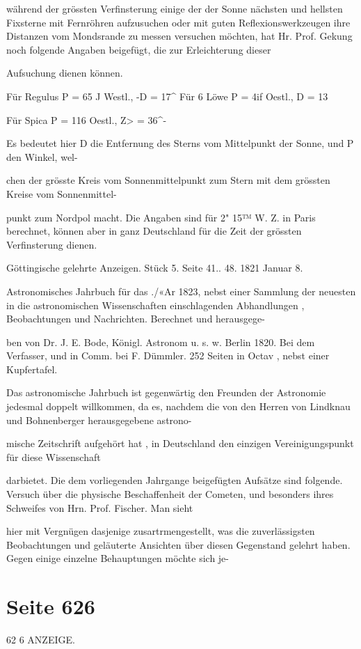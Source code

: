 \documentclass[10pt,a4paper]{article}
\begin{document}
während der grössten Verfinsterung einige der der Sonne nächsten und hellsten Fixsterne mit Fernröhren aufzusuchen oder mit guten Reflexionswerkzeugen ihre Distanzen vom Mondsrande zu messen versuchen möchten, hat Hr. Prof. Gekung noch folgende Angaben beigefügt, die zur Erleichterung dieser

Aufsuchung dienen können.

Für Regulus P = 65 J\textdegree{} Westl., -D = 17\textasciicircum{}\textdegree{} Für 6 Löwe P = 4if\textdegree{} Oestl., D = 13\textdegree{}

Für Spica P = 116\textdegree{} Oestl., Z> = 36\textasciicircum{}-\textdegree{}

Es bedeutet hier D die Entfernung des Sterns vom Mittelpunkt der Sonne, und P den Winkel, wel-

chen der grösste Kreis vom Sonnenmittelpunkt zum Stern mit dem grössten Kreise vom Sonnenmittel-

punkt zum Nordpol macht. Die Angaben sind für 2" 15™ W. Z. in Paris berechnet, können aber in ganz Deutschland für die Zeit der grössten Verfinsterung dienen.

Göttingische gelehrte Anzeigen. Stück 5. Seite 41.. 48. 1821 Januar 8.

Astronomisches Jahrbuch für das ./«Ar 1823, nebst einer Sammlung der neuesten in die astronomischen Wissenschaften einschlagenden Abhandlungen , Beobachtungen und Nachrichten. Berechnet und herausgege-

ben von Dr. J. E. Bode, Königl. Astronom u. s. w. Berlin 1820. Bei dem Verfasser, und in Comm. bei F. Dümmler. 252 Seiten in Octav , nebst einer Kupfertafel.

Das astronomische Jahrbuch ist gegenwärtig den Freunden der Astronomie jedesmal doppelt willkommen, da es, nachdem die von den Herren von Lindknau und Bohnenberger herausgegebene astrono-

mische Zeitschrift aufgehört hat , in Deutschland den einzigen Vereinigungspunkt für diese Wissenschaft

darbietet. Die dem vorliegenden Jahrgange beigefügten Aufsätze sind folgende. Versuch über die physische Beschaffenheit der Cometen, und besonders ihres Schweifes von Hrn. Prof. Fischer. Man sieht

hier mit Vergnügen dasjenige zusartrmengestellt, was die zuverlässigsten Beobachtungen und geläuterte Ansichten über diesen Gegenstand gelehrt haben. Gegen einige einzelne Behauptungen möchte sich je-


\newpage
\section*{Seite 626}
62 6 ANZEIGE.
\end{document}
